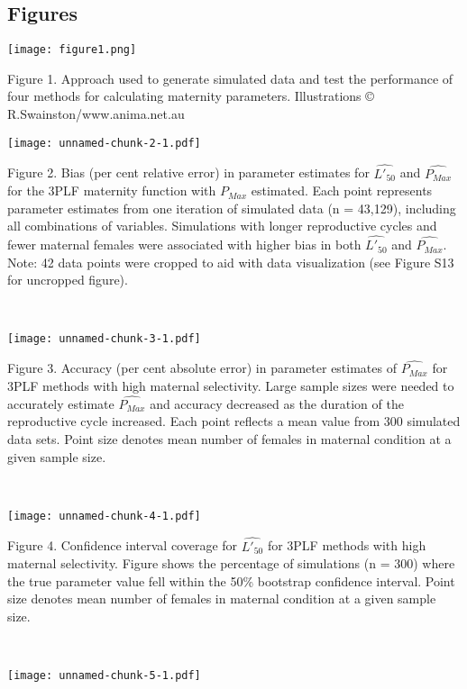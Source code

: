 \documentclass[
]{article}
\author{}
\date{\vspace{-2.5em}}
\begin{document}
\subsection{Figures}\label{figures}

\texttt{[image: figure1.png]}

Figure 1. Approach used to generate simulated data and test the
performance of four methods for calculating maternity parameters.
Illustrations © R.Swainston/www.anima.net.au

\texttt{[image: unnamed-chunk-2-1.pdf]}

Figure 2. Bias (per cent relative error) in parameter estimates for
\(\hat{L'_{50}}\) and \(\hat{P_{Max}}\) for the 3PLF maternity function
with \(P_{Max}\) estimated. Each point represents parameter estimates
from one iteration of simulated data (n = 43,129), including all
combinations of variables. Simulations with longer reproductive cycles
and fewer maternal females were associated with higher bias in both
\(\hat{L'_{50}}\) and \(\hat{P_{Max}}\). Note: 42 data points were
cropped to aid with data visualization (see Figure S13 for uncropped
figure).\\
\strut \\
\newpage

\texttt{[image: unnamed-chunk-3-1.pdf]}

Figure 3. Accuracy (per cent absolute error) in parameter estimates of
\(\hat{P_{Max}}\) for 3PLF methods with high maternal selectivity. Large
sample sizes were needed to accurately estimate \(\hat{P_{Max}}\) and
accuracy decreased as the duration of the reproductive cycle increased.
Each point reflects a mean value from 300 simulated data sets. Point
size denotes mean number of females in maternal condition at a given
sample size.\\
\strut \\
\newpage

\texttt{[image: unnamed-chunk-4-1.pdf]}

Figure 4. Confidence interval coverage for \(\hat{L'_{50}}\) for 3PLF
methods with high maternal selectivity. Figure shows the percentage of
simulations (n = 300) where the true parameter value fell within the
50\% bootstrap confidence interval. Point size denotes mean number of
females in maternal condition at a given sample size.\\
\strut \\
\newpage

\texttt{[image: unnamed-chunk-5-1.pdf]}
\end{document}
